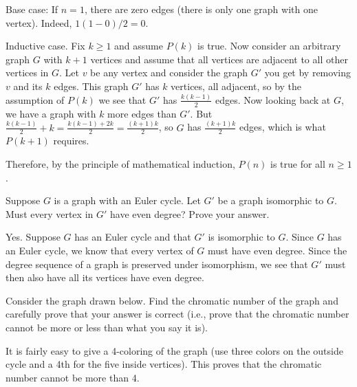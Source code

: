 \documentclass[12pt]{exam}
\begin{document}
\begin{questions}
\begin{parts}
\begin{solution}
		Base case: If $n = 1$, there are zero edges (there is only one graph with one vertex).  Indeed, $1(1-0)/2 = 0$.

		Inductive case.  Fix $k\ge 1$ and assume $P(k)$ is true.  Now consider an arbitrary graph $G$ with $k+1$ vertices and assume that all vertices are adjacent to all other vertices in $G$.  Let $v$ be any vertex and consider the graph $G'$ you get by removing $v$ and its $k$ edges.  This graph $G'$ has $k$ vertices, all adjacent, so by the assumption of $P(k)$ we see that $G'$ has $\frac{k(k-1)}{2}$ edges.  Now looking back at $G$, we have a graph with $k$ more edges than $G'$.
		But $\frac{k(k-1)}{2} + k = \frac{k(k-1)+2k}{2} = \frac{(k+1)k}{2}$, so $G$ has $\frac{(k+1)k}{2}$ edges, which is what $P(k+1)$ requires.

		Therefore, by the principle of mathematical induction, $P(n)$ is true for all $n \ge 1$.
	\end{solution}
\end{parts}

\question[10] Suppose $G$ is a graph with an Euler cycle.  Let $G'$ be a graph isomorphic to $G$.  Must every vertex in $G'$ have even degree?  Prove your answer.

\begin{solution}
	Yes.  Suppose $G$ has an Euler cycle and that $G'$ is isomorphic to $G$.  Since $G$ has an Euler cycle, we know that every vertex of $G$ must have even degree.  Since the degree sequence of a graph is preserved under isomorphism, we see that $G'$ must then also have all its vertices have even degree.
\end{solution}

\question[10] Consider the graph drawn below.  Find the chromatic number of the graph and carefully prove that your answer is correct (i.e., prove that the chromatic number cannot be more or less than what you say it is).

\begin{center}
\end{center}

\begin{solution}
	It is fairly easy to give a 4-coloring of the graph (use three colors on the outside cycle and a 4th for the five inside vertices).  This proves that the chromatic number cannot be more than 4.


\end{solution}
\end{questions}
\end{document}
